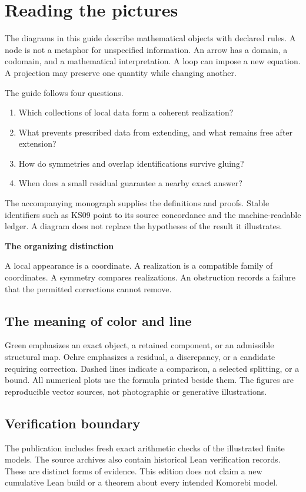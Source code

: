 \documentclass[11pt]{article}
\begin{document}
\KomorebiCover
\section*{Reading the pictures}
The diagrams in this guide describe mathematical objects with declared rules. A node is not a metaphor for unspecified information. An arrow has a domain, a codomain, and a mathematical interpretation. A loop can impose a new equation. A projection may preserve one quantity while changing another.

The guide follows four questions.
\begin{enumerate}
\item Which collections of local data form a coherent realization?
\item What prevents prescribed data from extending, and what remains free after extension?
\item How do symmetries and overlap identifications survive gluing?
\item When does a small residual guarantee a nearby exact answer?
\end{enumerate}

The accompanying monograph supplies the definitions and proofs. Stable identifiers such as KS09 point to its source concordance and the machine-readable ledger. A diagram does not replace the hypotheses of the result it illustrates.

\begin{insight}
\textbf{The organizing distinction}\par
A local appearance is a coordinate. A realization is a compatible family of coordinates. A symmetry compares realizations. An obstruction records a failure that the permitted corrections cannot remove.
\end{insight}

\subsection*{The meaning of color and line}
Green emphasizes an exact object, a retained component, or an admissible structural map. Ochre emphasizes a residual, a discrepancy, or a candidate requiring correction. Dashed lines indicate a comparison, a selected splitting, or a bound. All numerical plots use the formula printed beside them. The figures are reproducible vector sources, not photographic or generative illustrations.

\subsection*{Verification boundary}
The publication includes fresh exact arithmetic checks of the illustrated finite models. The source archives also contain historical Lean verification records. These are distinct forms of evidence. This edition does not claim a new cumulative Lean build or a theorem about every intended Komorebi model.
\end{document}
